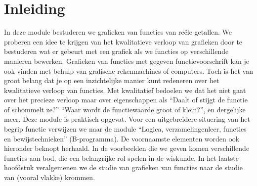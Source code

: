 


\hyphenation{}%


\setcounter{module}{9}


\parindent 0mm

\section*{Inleiding}%


In deze module bestuderen we grafieken van functies van re\"ele
getallen. We proberen een idee te krijgen van het kwalitatieve verloop
van grafieken door te bestuderen wat er gebeurt met een grafiek als we
functies op verschillende manieren bewerken. Grafieken van functies
met gegeven functievoorschrift kan je ook vinden met behulp van
grafische rekenmachines of computers. Toch is het van groot belang dat
je op een inzichtelijke manier kunt redeneren over het kwalitatieve
verloop van functies. Met kwalitatief bedoelen we dat het niet gaat
over het precieze verloop maar over eigenschappen als ``Daalt of
stijgt de functie of schommelt ze?'' ``Waar wordt de functiewaarde
groot of klein?'', en dergelijke meer. Deze module is praktisch
opgevat. Voor een uitgebreidere situering van het begrip functie
verwijzen we naar de module ``Logica, verzamelingenleer, functies en
bewijstechnieken'' (B-programma). De voornaamste elementen worden
ook hieronder beknopt herhaald. In de voorbeelden die we geven
komen verschillende functies aan bod, die een belangrijke rol spelen
in de wiskunde.  In het laatste hoofdstuk veralgemenen we de studie
van grafieken van functies naar de studie van (vooral vlakke) krommen.

